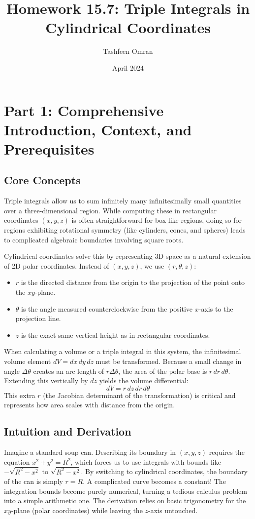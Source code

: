 \documentclass[11pt]{article}
\title{\textbf{Homework 15.7: Triple Integrals in Cylindrical Coordinates}}
\author{Tashfeen Omran}
\date{April 2024}
\begin{document}
\maketitle
\tableofcontents
\newpage

\section{Part 1: Comprehensive Introduction, Context, and Prerequisites}

\subsection{Core Concepts}
Triple integrals allow us to sum infinitely many infinitesimally small quantities over a three-dimensional region. While computing these in rectangular coordinates $(x, y, z)$ is often straightforward for box-like regions, doing so for regions exhibiting rotational symmetry (like cylinders, cones, and spheres) leads to complicated algebraic boundaries involving square roots. 

Cylindrical coordinates solve this by representing 3D space as a natural extension of 2D polar coordinates. Instead of $(x, y, z)$, we use $(r, \theta, z)$:
\begin{itemize}
    \item $r$ is the directed distance from the origin to the projection of the point onto the $xy$-plane.
    \item $\theta$ is the angle measured counterclockwise from the positive $x$-axis to the projection line.
    \item $z$ is the exact same vertical height as in rectangular coordinates.
\end{itemize}
When calculating a volume or a triple integral in this system, the infinitesimal volume element $dV = dx \, dy \, dz$ must be transformed. Because a small change in angle $\Delta\theta$ creates an arc length of $r \Delta\theta$, the area of the polar base is $r \, dr \, d\theta$. Extending this vertically by $dz$ yields the volume differential:
\[ dV = r \, dz \, dr \, d\theta \]
This extra $r$ (the Jacobian determinant of the transformation) is critical and represents how area scales with distance from the origin.

\subsection{Intuition and Derivation}
Imagine a standard soup can. Describing its boundary in $(x,y,z)$ requires the equation $x^2 + y^2 = R^2$, which forces us to use integrals with bounds like $-\sqrt{R^2 - x^2}$ to $\sqrt{R^2 - x^2}$. By switching to cylindrical coordinates, the boundary of the can is simply $r = R$. A complicated curve becomes a constant! The integration bounds become purely numerical, turning a tedious calculus problem into a simple arithmetic one. The derivation relies on basic trigonometry for the $xy$-plane (polar coordinates) while leaving the $z$-axis untouched.
\end{document}
